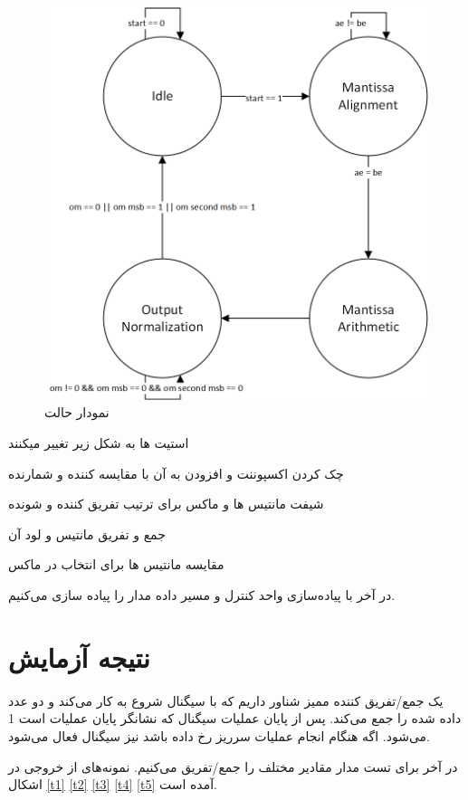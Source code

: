 \documentclass[fleqn]{article}
\begin{document}
\begin{figure}[!htbp]
    \includegraphics[width=\textwidth]{Assets/StateDiagram.png}
    \caption{نمودار حالت}
    \label{sd}
\end{figure}

استیت ها به شکل زیر تغییر میکنند

چک کردن اکسپوننت و افزودن به آن با مقایسه کننده و شمارنده

شیفت مانتیس ها و ماکس برای ترتیب تفریق کننده و شونده

جمع و تفریق مانتیس و لود آن

مقایسه مانتیس ها برای انتخاب در ماکس

در آخر با پیاده‌سازی واحد کنترل و مسیر داده مدار را پیاده سازی می‌کنیم.


\section{نتیجه آزمایش}
یک جمع/تفریق کننده ممیز شناور داریم که با سیگنال 
شروع به کار می‌کند و دو عدد داده شده را جمع می‌کند. پس از پایان عملیات سیگنال 
که نشانگر پایان عملیات است 1 می‌شود. اگه هنگام انجام عملیات سرریز رخ داده باشد نیز سیگنال 
فعال می‌شود. 

در آخر برای تست مدار مقادیر مختلف را جمع/تفریق می‌کنیم. نمونه‌های از خروجی در اشکال 
\ref{t1}
\ref{t2}
\ref{t3}
\ref{t4}
\ref{t5}
آمده است.
\end{document}

